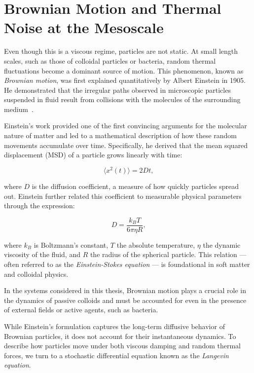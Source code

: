 \section{Brownian Motion and Thermal Noise at the Mesoscale}

Even though this is a viscous regime, particles are not static. At small length scales, such as those of colloidal particles or bacteria, random thermal fluctuations become a dominant source of motion. This phenomenon, known as \textit{Brownian motion}, was first explained quantitatively by Albert Einstein in 1905. He demonstrated that the irregular paths observed in microscopic particles suspended in fluid result from collisions with the molecules of the surrounding medium~\cite{einstein1906theory}.

Einstein's work provided one of the first convincing arguments for the molecular nature of matter and led to a mathematical description of how these random movements accumulate over time. Specifically, he derived that the mean squared displacement (MSD) of a particle grows linearly with time:

\begin{equation}
  \langle x^2(t) \rangle = 2Dt\text{,}
  \label{eq:msd}
\end{equation}

where $D$ is the diffusion coefficient, a measure of how quickly particles spread out. Einstein further related this coefficient to measurable physical parameters through the expression:

\begin{equation}
  D = \frac{k_{B}T}{6\pi \eta R}\text{,}
  \label{eq:diffusioncoefficient}
\end{equation}

where $k_B$ is Boltzmann’s constant, $T$ the absolute temperature, $\eta$ the dynamic viscosity of the fluid, and $R$ the radius of the spherical particle. This relation — often referred to as the \textit{Einstein-Stokes equation} — is foundational in soft matter and colloidal physics.

In the systems considered in this thesis, Brownian motion plays a crucial role in the dynamics of passive colloids and must be accounted for even in the presence of external fields or active agents, such as bacteria.

\vspace{1em}

While Einstein’s formulation captures the long-term diffusive behavior of Brownian particles, it does not account for their instantaneous dynamics. To describe how particles move under both viscous damping and random thermal forces, we turn to a stochastic differential equation known as the \textit{Langevin equation}.

